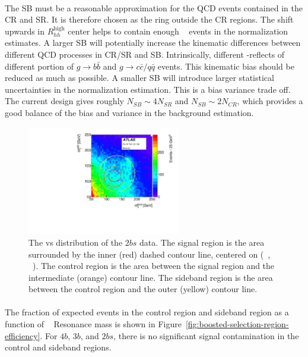 \paragraph{}
The SB must be a reasonable approximation for the QCD events contained in the CR and SR.
It is therefore chosen as the ring outside the CR regions.
The shift upwards in $R_{hh}^{\text{high}}$ center helps to contain enough \ttbar~ events in the normalization estimates.
A larger SB will potentially increase the kinematic differences between different QCD processes in CR/SR and SB.
Intrinsically, different \mleadJ-\msublJ reflects of different portion of $g \to b\bar{b}$ and $g \to c\bar{c}/q\bar{q}$ events.
This kinematic bias should be reduced as much as possible.
A smaller SB will introduce larger statistical uncertainties in the normalization estimation.
This is a bias variance trade off.
The current design gives roughly $N_{SB} \sim 4 N_{SR}$ and $N_{SB} \sim 2 N_{CR}$, which provides a good balance of the bias and variance in the background estimation.

\begin{figure}[htbp!]
\begin{center}
  \includegraphics[width=0.6\textwidth,angle=-90]{figures/boosted/Other/TwoTag_split_Incl_data_mH0H1.pdf}
  \caption{The \mleadJ vs \msublJ distribution of the $2bs$ data. The signal region is the area surrounded by the inner (red) dashed contour line, centered on (~\GeV, ~\GeV). The control region is the area between the signal region and the intermediate (orange) contour line. The sideband region is the area between the control region and the outer (yellow) contour line.}
  \label{fig:boosted-region-def}
\end{center}
\end{figure}

\paragraph{}
The fraction of expected events in the control region and sideband region as a function of \Grav~ Resonance mass is shown in Figure~\ref{fig:boosted-selection-region-efficiency}. 
For $4b$, $3b$, and $2bs$, there is no significant signal contamination in the control and sideband regions.


